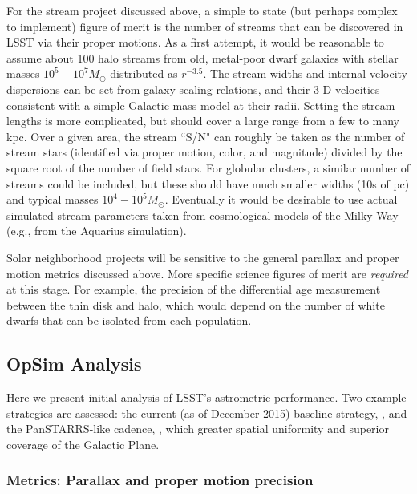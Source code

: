 For the stream project discussed above, a simple to state (but perhaps complex to implement) figure of merit
is the number of streams that can be discovered in LSST via their proper motions. As a first
attempt, it would be reasonable to assume about 100 halo streams from old, metal-poor dwarf galaxies with
stellar masses $10^5-10^7 M_{\odot}$ distributed as $r^{-3.5}$. The stream widths and internal velocity
dispersions can be set from galaxy scaling relations, and their 3-D velocities consistent with a simple Galactic mass
model at their radii. Setting the stream lengths is more complicated, but should cover a large range from a few to many kpc.
Over a given area, the stream ``S/N" can roughly be taken as the number of stream stars (identified via proper motion, color, and magnitude)
divided by the square root of the number of field stars. For globular clusters, a similar number of streams could be included, but these should have much smaller widths (10s of pc)
and typical masses $10^4-10^5 M_{\odot}$. Eventually it would be desirable to use actual simulated stream parameters taken from cosmological models of the Milky Way (e.g.,
from the Aquarius simulation).

Solar neighborhood projects will be sensitive to the general parallax and proper motion metrics discussed above. More specific science figures of merit are {\it required} at this stage.  For example, the precision of the differential age measurement between the thin disk and halo, which would depend on the number of white dwarfs that can be isolated
from each population.

\subsection{OpSim Analysis}
\label{sec:\secname:MW_Astrometry_OpSim}

Here we present initial analysis of LSST's astrometric
performance. Two example strategies are assessed: the current (as of
December 2015) baseline strategy, , and the
PanSTARRS-like cadence, , which greater
spatial uniformity and superior coverage of the Galactic Plane.

\subsubsection{Metrics: Parallax and proper motion precision}

